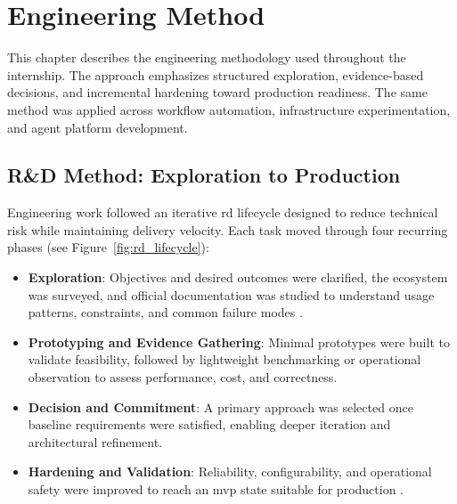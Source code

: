 \chapter{Engineering Method}
\label{ch:EngineeringMethod}

This chapter describes the engineering methodology used throughout the
internship. The approach emphasizes structured exploration, evidence-based
decisions, and incremental hardening toward production readiness.
The same method was applied across workflow automation, infrastructure
experimentation, and agent platform development.

\section{R\&D Method: Exploration to Production}
\label{sec:RDMethod}

Engineering work followed an iterative \gls{rd} lifecycle designed to reduce
technical risk while maintaining delivery velocity. Each task moved through
four recurring phases (see Figure~\ref{fig:rd_lifecycle}):

\begin{itemize}
    \item \textbf{Exploration}: Objectives and desired outcomes were clarified,
          the ecosystem was surveyed, and official documentation was studied to
          understand usage patterns, constraints, and common failure modes
          \cite{googleTechWriting,diataxis}.

    \item \textbf{Prototyping and Evidence Gathering}: Minimal prototypes were
          built to validate feasibility, followed by lightweight benchmarking or
          operational observation to assess performance, cost, and correctness.

    \item \textbf{Decision and Commitment}: A primary approach was selected once
          baseline requirements were satisfied, enabling deeper iteration and
          architectural refinement.

    \item \textbf{Hardening and Validation}: Reliability, configurability, and
          operational safety were improved to reach an \gls{mvp} state suitable
          for production \cite{googleSRE,microsoftWellArchitected}.
\end{itemize}

